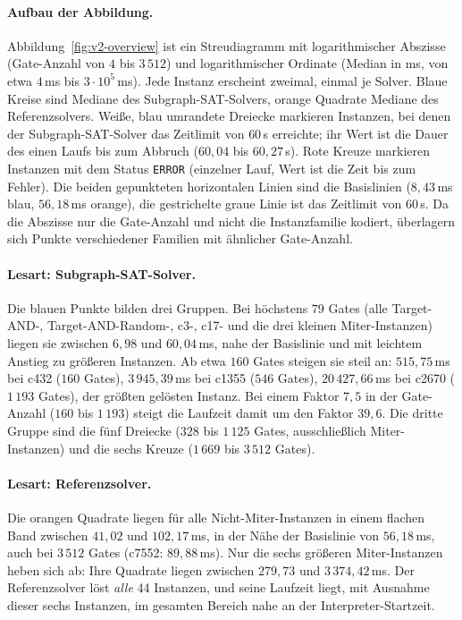 \documentclass[a4paper,12pt]{article}
\theoremstyle{definition}
\begin{document}
\paragraph{Aufbau der Abbildung.} Abbildung~\ref{fig:v2-overview} ist ein Streudiagramm mit logarithmischer Abszisse (Gate-Anzahl von $4$ bis $3\,512$) und logarithmischer Ordinate (Median in ms, von etwa $4$\,ms bis $3 \cdot 10^5$\,ms). Jede Instanz erscheint zweimal, einmal je Solver. Blaue Kreise sind Mediane des Subgraph-SAT-Solvers, orange Quadrate Mediane des Referenzsolvers. Weiße, blau umrandete Dreiecke markieren Instanzen, bei denen der Subgraph-SAT-Solver das Zeitlimit von $60$\,s erreichte; ihr Wert ist die Dauer des einen Laufs bis zum Abbruch ($60{,}04$ bis $60{,}27$\,s). Rote Kreuze markieren Instanzen mit dem Status \texttt{ERROR} (einzelner Lauf, Wert ist die Zeit bis zum Fehler). Die beiden gepunkteten horizontalen Linien sind die Basislinien ($8{,}43$\,ms blau, $56{,}18$\,ms orange), die gestrichelte graue Linie ist das Zeitlimit von $60$\,s. Da die Abszisse nur die Gate-Anzahl und nicht die Instanzfamilie kodiert, überlagern sich Punkte verschiedener Familien mit ähnlicher Gate-Anzahl.

\paragraph{Lesart: Subgraph-SAT-Solver.} Die blauen Punkte bilden drei Gruppen. Bei höchstens $79$ Gates (alle Target-AND-, Target-AND-Random-, c3-, c17- und die drei kleinen Miter-Instanzen) liegen sie zwischen $6{,}98$ und $60{,}04$\,ms, nahe der Basislinie und mit leichtem Anstieg zu größeren Instanzen. Ab etwa $160$ Gates steigen sie steil an: $515{,}75$\,ms bei c432 ($160$ Gates), $3\,945{,}39$\,ms bei c1355 ($546$ Gates), $20\,427{,}66$\,ms bei c2670 ($1\,193$ Gates), der größten gelösten Instanz. Bei einem Faktor $7{,}5$ in der Gate-Anzahl ($160$ bis $1\,193$) steigt die Laufzeit damit um den Faktor $39{,}6$. Die dritte Gruppe sind die fünf Dreiecke ($328$ bis $1\,125$ Gates, ausschließlich Miter-Instanzen) und die sechs Kreuze ($1\,669$ bis $3\,512$ Gates).

\paragraph{Lesart: Referenzsolver.} Die orangen Quadrate liegen für alle Nicht-Miter-Instanzen in einem flachen Band zwischen $41{,}02$ und $102{,}17$\,ms, in der Nähe der Basislinie von $56{,}18$\,ms, auch bei $3\,512$ Gates (c7552: $89{,}88$\,ms). Nur die sechs größeren Miter-Instanzen heben sich ab: Ihre Quadrate liegen zwischen $279{,}73$ und $3\,374{,}42$\,ms. Der Referenzsolver löst \emph{alle} 44 Instanzen, und seine Laufzeit liegt, mit Ausnahme dieser sechs Instanzen, im gesamten Bereich nahe an der Interpreter-Startzeit.
\end{document}
